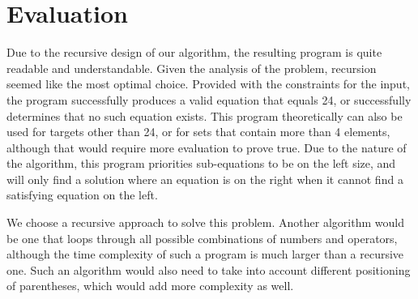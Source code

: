 \documentclass[a4paper,10pt]{article}
\begin{document}
\section{Evaluation}
Due to the recursive design of our algorithm, the resulting program is quite readable and understandable. Given the analysis of the problem, recursion seemed like the most optimal choice. Provided with the constraints for the input, the program successfully produces a valid equation that equals 24, or successfully determines that no such equation exists. This program theoretically can also be used for targets other than 24, or for sets that contain more than 4 elements, although that would require more evaluation to prove true. Due to the nature of the algorithm, this program priorities sub-equations to be on the left size, and will only find a solution where an equation is on the right when it cannot find a satisfying equation on the left.

	We choose a recursive approach to solve this problem. Another algorithm would be one that loops through all possible combinations of numbers and operators, although the time complexity of such a program is much larger than a recursive one. Such an algorithm would also need to take into account different positioning of parentheses, which would add more complexity as well. 
\end{document}
